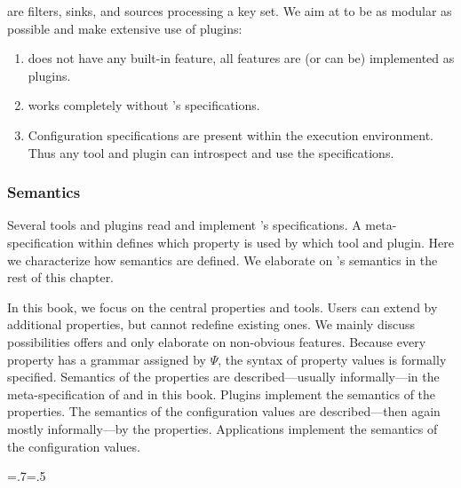  are filters, sinks, and sources processing a key set.
We aim at  to be as modular as possible and make extensive use of plugins:

\begin{enumerate}
\item {} does not have any built-in feature, all features are (or can be) implemented as plugins.
\item \elektra{} works completely without 's specifications.
\item Configuration specifications are present within the execution environment.
Thus any tool and plugin can introspect and use the specifications.
\end{enumerate}

\subsubsection{Semantics}

Several tools and plugins read and implement 's specifications.
A meta-specification within \elektra{} defines which property is used by which tool and plugin.
Here we characterize how semantics are defined.
We elaborate on 's semantics in the rest of this chapter.

In this book, we focus on the central properties and tools.
Users can extend  by additional properties, but cannot redefine existing ones.
We mainly discuss possibilities  offers and only elaborate on non-obvious features.
Because every property has a grammar assigned by $\Psi$, the syntax of property values is formally specified.
Semantics of the properties are described---usually informally---in the meta-specification of  and in this book.
Plugins implement the semantics of the properties.
The semantics of the configuration values are described---then again mostly informally---by the properties.
Applications implement the semantics of the configuration values.%
{\parfillskip=.7\textwidth \emergencystretch=.5\textwidth \par}

